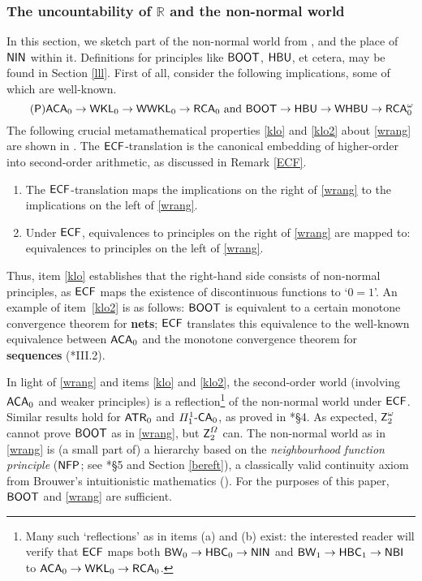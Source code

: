 \documentclass[reqno]{amsart}
\newcommand\be{\begin{equation}}
\newcommand\ee{\end{equation}}
\def\FIVE{\Pi_{1}^{1}\text{-\textup{\textsf{CA}}}_{0}}
\def\ATR{\textup{\textsf{ATR}}}
\def\Z{\textup{\textsf{Z}}}
\def\NFP{\textup{\textsf{NFP}}}
\def\RCA{\textup{\textsf{RCA}}}
\def\RCAo{\textup{\textsf{RCA}}_{0}^{\omega}}
\def\WKL{\textup{\textsf{WKL}}}
\def\WWKL{\textup{\textsf{WWKL}}}
\def\R{{\mathbb  R}}
\def\di{\rightarrow}
\def\ACA{\textup{\textsf{ACA}}}
\def\HBU{\textup{\textsf{HBU}}}
\def\BW{\textup{\textsf{BW}}}
\def\NBI{\textup{\textsf{NBI}}}
\def\NIN{\textup{\textsf{NIN}}}
\def\BOOT{\textup{\textsf{BOOT}}}
\def\WHBU{\textup{\textsf{WHBU}}}
\def\HBC{\textup{\textsf{HBC}}}
\def\ECF{\textup{\textsf{ECF}}}
\numberwithin{equation}{section}
\numberwithin{thm}{section}
\begin{document}
\subsubsection{The uncountability of $\R$ and the non-normal world}\label{nonnorm}
In this section, we sketch part of the non-normal world from \cite{samph}, and the place of $\NIN$ within it.  
Definitions for principles like $\BOOT$, $\HBU$, et cetera, may be found in Section \ref{lll}.
First of all, consider the following implications, some of which are well-known.
\be\label{wrang}\tag{\textsf{P}}
\ACA_{0}\di \WKL_{0}\di \WWKL_{0}\di \RCA_{0} \textup{ and } \BOOT\di \HBU\di \WHBU \di \RCAo
\ee
The following crucial metamathematical properties \eqref{klo} and \eqref{klo2} about \eqref{wrang} are shown in \cite{samph}.
The $\ECF$-translation is the canonical embedding of higher-order into second-order arithmetic, as discussed in Remark \ref{ECF}.
\begin{enumerate}
 \renewcommand{\theenumi}{\alph{enumi}}
\item The $\ECF$-translation maps the implications on the right of \eqref{wrang} to the implications on the left of \eqref{wrang}. \label{klo}
\item Under $\ECF$, equivalences to principles on the right of \eqref{wrang} are mapped to: equivalences to principles on the left of \eqref{wrang}.  \label{klo2}
\end{enumerate}
Thus, item \eqref{klo} establishes that the right-hand side consists of non-normal principles, as $\ECF$ maps the existence of discontinuous functions to `$0=1$'.
An example of item~\eqref{klo2} is as follows: $\BOOT$ is equivalent to a certain monotone convergence theorem for \textbf{nets}; $\ECF$ translates this equivalence to the well-known equivalence
between $\ACA_{0}$ and the monotone convergence theorem for \textbf{sequences} (\cite{simpson2}*{III.2}). 

\smallskip

In light of \eqref{wrang} and items \eqref{klo} and \eqref{klo2}, the second-order world (involving $\ACA_{0}$ and weaker principles) is a reflection\footnote{Many such `reflections' as in items (a) and (b) exist: the interested reader will verify that $\ECF$ maps both $\BW_{0}\di \HBC_{0}\di \NIN$ and $\BW_{1}\di \HBC_{1}\di \NBI$ to $\ACA_{0}\di \WKL_{0}\di \RCA_{0}$.} of the non-normal world under $\ECF$.  
Similar results hold for $\ATR_{0}$ and $\FIVE$, as proved in \cite{samph}*{\S4}.   As expected, $\Z_{2}^{\omega}$ cannot prove $\BOOT$ as in \eqref{wrang}, but $\Z_{2}^{\Omega}$ can.   
The non-normal world as in \eqref{wrang} is (a small part of) a hierarchy based on the \emph{neighbourhood function principle} ($\NFP$; see \cite{samph}*{\S5} and Section \ref{bereft}), a classically valid continuity axiom 
from Brouwer's intuitionistic mathematics (\cite{troeleke1}). 
For the purposes of this paper, $\BOOT$ and \eqref{wrang} are sufficient. 
\end{document}
